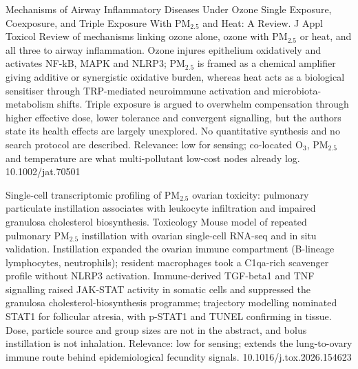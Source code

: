 \documentclass[10pt]{article}
\begin{document}
{Mechanisms of Airway Inflammatory Diseases Under Ozone Single Exposure, Coexposure, and Triple Exposure With PM$_{2.5}$ and Heat: A Review.}
{J Appl Toxicol}
{Review of mechanisms linking ozone alone, ozone with PM$_{2.5}$ or heat, and all three to airway inflammation. Ozone injures epithelium oxidatively and activates NF-kB, MAPK and NLRP3; PM$_{2.5}$ is framed as a chemical amplifier giving additive or synergistic oxidative burden, whereas heat acts as a biological sensitiser through TRP-mediated neuroimmune activation and microbiota-metabolism shifts. Triple exposure is argued to overwhelm compensation through higher effective dose, lower tolerance and convergent signalling, but the authors state its health effects are largely unexplored. No quantitative synthesis and no search protocol are described. Relevance: low for sensing; co-located O$_3$, PM$_{2.5}$ and temperature are what multi-pollutant low-cost nodes already log.}
{10.1002/jat.70501}

\par{}\baselineskip{}\baselineskip
{}

{Single-cell transcriptomic profiling of PM$_{2.5}$ ovarian toxicity: pulmonary particulate instillation associates with leukocyte infiltration and impaired granulosa cholesterol biosynthesis.}
{Toxicology}
{Mouse model of repeated pulmonary PM$_{2.5}$ instillation with ovarian single-cell RNA-seq and in situ validation. Instillation expanded the ovarian immune compartment (B-lineage lymphocytes, neutrophils); resident macrophages took a C1qa-rich scavenger profile without NLRP3 activation. Immune-derived TGF-beta1 and TNF signalling raised JAK-STAT activity in somatic cells and suppressed the granulosa cholesterol-biosynthesis programme; trajectory modelling nominated STAT1 for follicular atresia, with p-STAT1 and TUNEL confirming in tissue. Dose, particle source and group sizes are not in the abstract, and bolus instillation is not inhalation. Relevance: low for sensing; extends the lung-to-ovary immune route behind epidemiological fecundity signals.}
{10.1016/j.tox.2026.154623}

\par{}\baselineskip{}\baselineskip
{}
\end{document}

